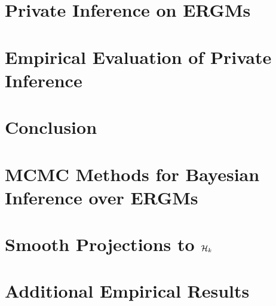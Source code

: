 \documentclass[12pt]{report}
\begin{document}
	
	\chapter{Private Inference on ERGMs}\label{ch:dp_stats}
	
	
	
	
	\chapter{Empirical Evaluation of Private Inference}\label{ch:experiments}
	
	
	
	\chapter{Conclusion}\label{conclusion}
	
	
	
	\cleardoublepage
	
	\nocite{*}
	\printbibliography	
	
	
		
		\appendix
		
		\chapter{MCMC Methods for Bayesian Inference over ERGMs}\label{appendix_mcmc}
		
		
		
		\chapter{Smooth Projections to $\mathcal{H}_k$}\label{appendix_projections}
		
		
		
		\chapter{Additional Empirical Results}\label{appendix_add_results}
		
		
	
\end{document}
